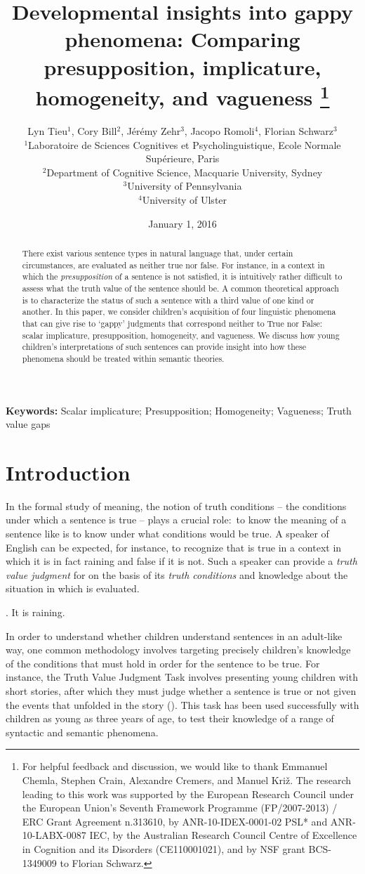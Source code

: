 \documentclass[12pt, letterpaper]{article}
\title{Developmental insights into gappy phenomena: Comparing presupposition, implicature, homogeneity, and vagueness
\thanks{For helpful feedback and discussion, we would like to thank Emmanuel Chemla, Stephen Crain, Alexandre Cremers, and Manuel Kri\v{z}. The research leading to this work was supported by the European Research Council under the European Union's Seventh Framework Programme (FP/2007-2013) / ERC Grant Agreement n.313610, by ANR-10-IDEX-0001-02 PSL* and ANR-10-LABX-0087 IEC, by the Australian Research Council Centre of Excellence in Cognition and its Disorders (CE110001021), and by NSF grant BCS-1349009 to Florian Schwarz.}}
\author{Lyn Tieu$^1$, Cory Bill$^2$, J\'er\'emy Zehr$^{3}$, Jacopo Romoli$^{4}$, Florian Schwarz$^{3}$\\
       $^1$Laboratoire de Sciences Cognitives et Psycholinguistique, Ecole Normale Sup\'{e}rieure, Paris\\
       	$^2$Department of Cognitive Science, Macquarie University, Sydney\\
	$^3$University of Pennsylvania\\
	$^4$University of Ulster\\
      }\renewcommand\Authfont{\small}
\date{January 1, 2016}
\begin{document}
\maketitle
\begin{abstract} 
\noindent There exist various sentence types in natural language that, under certain circumstances, are evaluated as neither true nor false. For instance, in a context in which the \textit{presupposition} of a sentence is not satisfied, it is intuitively rather difficult to assess what the truth value of the sentence should be. A common theoretical approach is to characterize the status of such a sentence with a third value of one kind or another. In this paper, we consider children's acquisition of four linguistic phenomena that can give rise to `gappy' judgments that correspond neither to True nor False: scalar implicature, presupposition, homogeneity, and vagueness. We discuss how young children's interpretations of such sentences can provide insight into how these phenomena should be treated within semantic theories. 
\end{abstract}

\noindent \textbf{Keywords:} Scalar implicature; Presupposition; Homogeneity; Vagueness; Truth value gaps

\section{Introduction}

In the formal study of meaning, the notion of truth conditions -- the conditions under which a sentence is true -- plays a crucial role:~to know the meaning of a sentence like \Next is to know under what conditions \Next would be true. A speaker of English can be expected, for instance, to recognize that \Next is true in a context in which it is in fact raining and false if it is not. Such a speaker can provide a \textit{truth value judgment} for \Next on the basis of its \textit{truth conditions} and knowledge about the situation in which \Next is evaluated. 

\ex. It is raining.

In order to understand whether children understand sentences in an adult-like way, one common methodology involves targeting precisely children's knowledge of the conditions that must hold in order for the sentence to be true. For instance, the Truth Value Judgment Task involves presenting young children with short stories, after which they must judge whether a sentence is true or not given the events that unfolded in the story (\citealt{Crain:1998,Crain:2000}). This task has been used successfully with children as young as three years of age, to test their knowledge of a range of syntactic and semantic phenomena.
\end{document}
